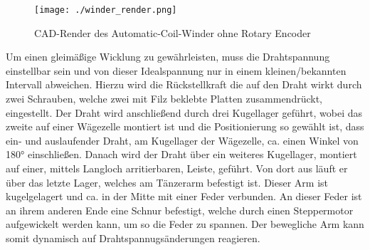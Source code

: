 \begin{figure}[H]
    \centering
    \texttt{[image: ./winder\_render.png]}
    \caption{CAD-Render des Automatic-Coil-Winder ohne Rotary Encoder}
    \label{fig:winder_render}
\end{figure}


Um einen gleimäßige Wicklung zu gewährleisten, muss die Drahtspannung einstellbar sein und von dieser Idealspannung nur in einem kleinen/bekannten Intervall abweichen. Hierzu wird die Rückstellkraft die auf den Draht wirkt durch zwei Schrauben, welche zwei mit Filz beklebte Platten zusammendrückt, eingestellt. Der Draht wird anschließend durch drei Kugellager geführt, wobei das zweite auf einer Wägezelle montiert ist und die Positionierung so gewählt ist, dass ein- und auslaufender Draht, am Kugellager der Wägezelle, ca. einen Winkel von 180° einschließen. Danach wird der Draht über ein weiteres Kugellager, montiert auf einer, mittels Langloch arritierbaren, Leiste, geführt. Von dort aus läuft er über das letzte Lager, welches am Tänzerarm befestigt ist. Dieser Arm ist kugelgelagert und ca. in der Mitte mit einer Feder verbunden. An dieser Feder ist an ihrem anderen Ende eine Schnur befestigt, welche durch einen Steppermotor aufgewickelt werden kann, um so die Feder zu spannen. Der bewegliche Arm kann somit dynamisch auf Drahtspannugsänderungen reagieren.
